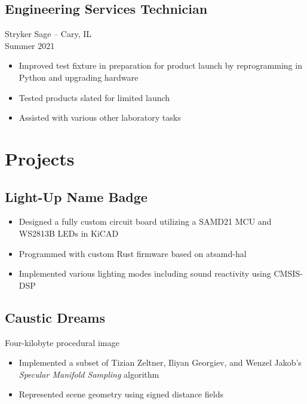 \documentclass[letterpaper,10pt]{article}
\begin{document}
\begin{paracol}{2}
    \subsection*{Engineering Services Technician}
    Stryker Sage -- Cary, IL \\
    Summer 2021

    \begin{itemize}[topsep=0.5em, partopsep=0em, itemsep=0.125em]
        \item Improved test fixture in preparation for product launch by reprogramming in Python and upgrading hardware
        \item Tested products slated for limited launch
        \item Assisted with various other laboratory tasks
    \end{itemize}

    \section*{Projects}

    \subsection*{Light-Up Name Badge}

    \begin{itemize}[topsep=0.5em, partopsep=0em, itemsep=0.125em]
        \item Designed a fully custom circuit board utilizing a SAMD21 MCU and WS2813B LEDs in KiCAD
        \item Programmed with custom Rust firmware based on atsamd-hal
        \item Implemented various lighting modes including sound reactivity using CMSIS-DSP
    \end{itemize}

    \subsection*{Caustic Dreams}
    Four-kilobyte procedural image

    \begin{itemize}[topsep=0.5em, partopsep=0em, itemsep=0.125em]
        \item Implemented a subset of Tizian Zeltner, Iliyan Georgiev, and Wenzel Jakob's \textit{Specular Manifold Sampling} algorithm
        \item Represented scene geometry using signed distance fields
    \end{itemize}


\end{paracol}
\end{document}
